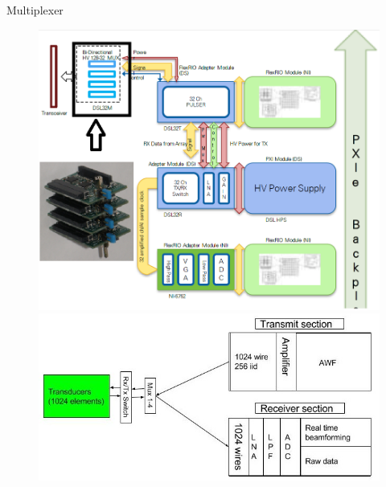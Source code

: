 \documentclass[t,12pt,english
\ifx\beamermode\undefined\else,\beamermode\fi
]{beamer}
\begin{document}
\begin{frame}{Multiplexer}

\begin{figure}[!htb]
\includegraphics[width=.95\textwidth]{2_1.png}
\endminipage
{}
\includegraphics[width=1\textwidth,left]{41.jpg}
\endminipage
\end{figure}

\end{frame}
\end{document}
